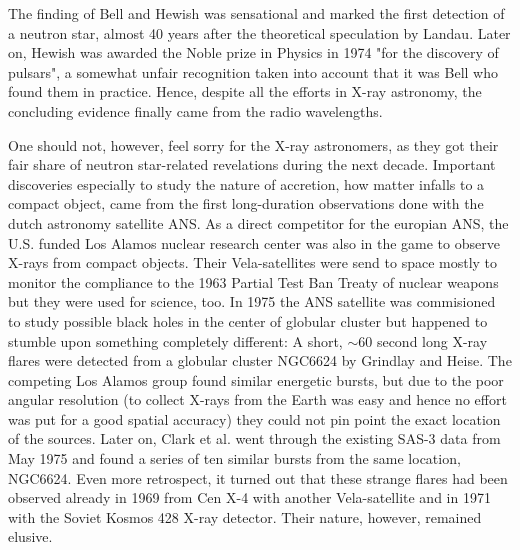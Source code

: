 The finding of Bell and Hewish was sensational and marked the first detection of a neutron star, almost 40 years after the theoretical speculation by Landau.
Later on, Hewish was awarded the Noble prize in Physics in 1974 "for the discovery of pulsars", a somewhat unfair recognition taken into account that it was Bell who found them in practice.
Hence, despite all the efforts in X-ray astronomy, the concluding evidence finally came from the radio wavelengths.



One should not, however, feel sorry for the X-ray astronomers, as they got their fair share of neutron star-related revelations during the next decade.
Important discoveries especially to study the nature of accretion, how matter infalls to a compact object, came from the first long-duration observations done with the dutch astronomy satellite ANS.
As a direct competitor for the europian ANS, the U.S. funded Los Alamos nuclear research center was also in the game to observe X-rays from compact objects.
Their Vela-satellites were send to space mostly to monitor the compliance to the 1963 Partial Test Ban Treaty of nuclear weapons but they were used for science, too.
In 1975 the ANS satellite was commisioned to study possible black holes in the center of globular cluster but happened to stumble upon something completely different:
A short, $\sim 60$ second long X-ray flares were detected from a globular cluster NGC6624 by Grindlay and Heise.\cite{GGS76}
The competing Los Alamos group found similar energetic bursts, but due to the poor angular resolution (to collect X-rays from the Earth was easy and hence no effort was put for a good spatial accuracy) they could not pin point the exact location of the sources.\cite{BCE76}
Later on, Clark et al. went through the existing SAS-3 data from May 1975 and found a series of ten similar bursts from the same location, NGC6624.\cite{CJB76}
Even more retrospect, it turned out that these strange flares had been observed already in 1969 from Cen X-4\cite{BCE72} with another Vela-satellite and in 1971 with the Soviet Kosmos 428 X-ray detector\cite{BKM75}.
Their nature, however, remained elusive.

